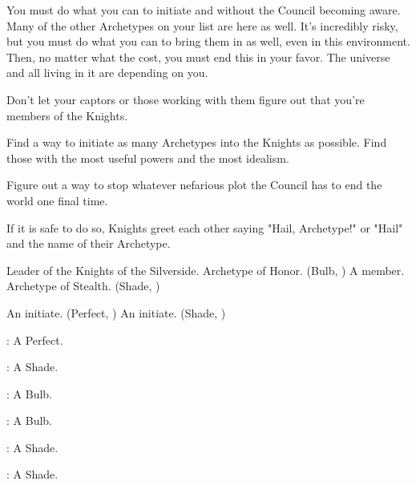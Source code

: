 \documentclass[blue]{Silversiders}
\begin{document}
You must do what you can to initiate \cTruth{} and \cWisdom{} without the Council becoming aware. Many of the other Archetypes on your list are here as well. It's incredibly risky, but you must do what you can to bring them in as well, even in this environment. Then, no matter what the cost, you must end this in your favor. The universe and all living in it are depending on you.

\begin{itemz}[Goals]
  \item Don't let your captors or those working with them figure out that you're members of the Knights.
  \item Find a way to initiate as many Archetypes into the Knights as possible. Find those with the most useful powers and the most idealism.
  \item Figure out a way to stop whatever nefarious plot the Council has to end the world one final time.
\end{itemz}

\begin{itemz}[Miscellaneous]
  \item If it is safe to do so, Knights greet each other saying "Hail, Archetype!" or "Hail" and the name of their Archetype.
\end{itemz}

\begin{members}
	\member{\cHonor{}} Leader of the Knights of the Silverside. Archetype of Honor. (Bulb, \cHonor{\Sex})
	\member{\cTraitor{}} A member. Archetype of Stealth. (Shade, \cTraitor{\Sex})
	
\end{members}

\begin{members}[Initiates]
	\member{\cTruth{}} An initiate. (Perfect, \cTruth{\Sex})
	\member{\cWisdom{}} An initiate. (Shade, \cWisdom{\Sex})
	
\end{members}

\begin{itemz}
	\item \cMuscle{}: A \cMuscle{\sex} Perfect.
	\item \cIngenuity{}: A \cIngenuity{\sex} Shade.
	\item \cOutcast{}: A \cOutcast{\sex} Bulb.
	\item \cCaregiver{}: A \cCaregiver{\sex} Bulb.
	\item \cLove{}: A \cLove{\sex} Shade.
	\item \cTrickster{}: A \cTrickster{\sex} Shade.

\end{itemz}
\end{document}
